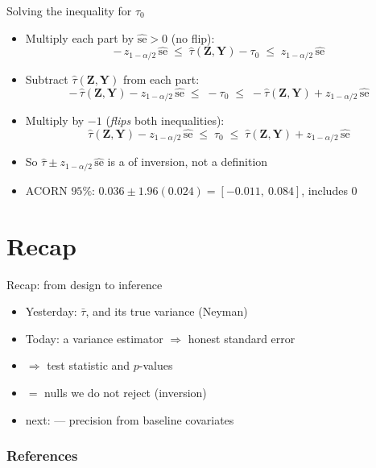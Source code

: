 \documentclass[table, xcolor = {dvipsnames}, 9pt]{beamer}
\theoremstyle{plain}
\newcommand{\mh}[1]{{\color{magenta}{#1}}}
\begin{document}
\begin{frame}[t]{Solving the inequality for $\tau_0$}
\vfill
\begin{itemize} \vfill
\item Multiply each part by $\widehat{\text{se}} > 0$ (no flip):
\begin{equation*}
-\,z_{1 - \alpha/2}\, \widehat{\text{se}} \;\leq\; \hat{\tau}\left(\bm{Z}, \bm{Y}\right) - \tau_0 \;\leq\; z_{1 - \alpha/2}\, \widehat{\text{se}}
\end{equation*} \vfill
\item Subtract $\hat{\tau}\left(\bm{Z}, \bm{Y}\right)$ from each part:
\begin{equation*}
-\,\hat{\tau}\left(\bm{Z}, \bm{Y}\right) - z_{1 - \alpha/2}\, \widehat{\text{se}} \;\leq\; -\tau_0 \;\leq\; -\hat{\tau}\left(\bm{Z}, \bm{Y}\right) + z_{1 - \alpha/2}\, \widehat{\text{se}}
\end{equation*} \vfill
\item Multiply by $-1$ (\emph{flips} both inequalities):
\begin{equation*}
\hat{\tau}\left(\bm{Z}, \bm{Y}\right) - z_{1 - \alpha/2}\, \widehat{\text{se}} \;\leq\; \tau_0 \;\leq\; \hat{\tau}\left(\bm{Z}, \bm{Y}\right) + z_{1 - \alpha/2}\, \widehat{\text{se}}
\end{equation*} \vfill
\item So $\hat{\tau} \pm z_{1 - \alpha/2}\, \widehat{\text{se}}$ is a \mh{consequence} of inversion, not a definition \vfill
\item ACORN $95\%$: $0.036 \pm 1.96(0.024) = [-0.011,\ 0.084]$, includes $0$ \vfill
\end{itemize} \vfill
\end{frame}
\section{Recap}

\begin{frame}[t]{Recap: from design to inference}
\vfill
\begin{itemize} \vfill
\item Yesterday: \mh{unbiased} $\bar{\tau}$, and its true variance (Neyman) \vfill
\item Today: a \mh{conservative} variance estimator $\Rightarrow$ honest standard error \vfill
\item \mh{Normal approximation} $\Rightarrow$ test statistic and $p$-values \vfill
\item \mh{Confidence interval} $=$ nulls we do not reject (inversion) \vfill
\item[] next: \mh{covariance adjustment} --- precision from baseline covariates \vfill
\end{itemize} \vfill
\end{frame}

\begin{frame}[allowframebreaks]
\frametitle{References}
\scriptsize


\end{frame}
\end{document}
